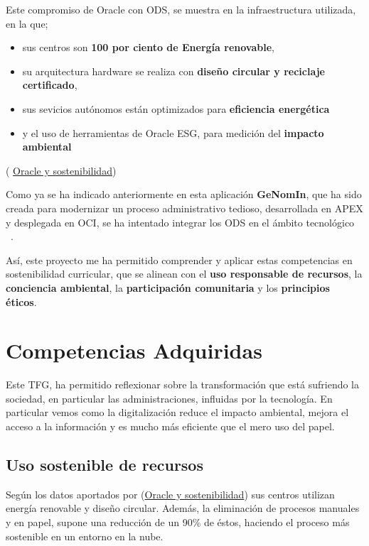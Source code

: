 Este compromiso de Oracle con \acrshort{ODS}, se muestra en la infraestructura utilizada, en la que; 
\begin{itemize}
	\item sus centros son \textbf{100 por ciento de Energía renovable}, 
	\item su arquitectura hardware se realiza con \textbf{diseño circular y reciclaje certificado}, 
	\item sus sevicios autónomos están optimizados para \textbf{eficiencia energética}
	\item y el uso de herramientas de Oracle  \acrfull{ESG}, para medición del \textbf{impacto ambiental}
\end{itemize}	( \href{https://www.oracle.com/es/sustainability/}{Oracle y sostenibilidad})

Como ya se ha indicado anteriormente en esta aplicación \textbf{GeNomIn}, que ha sido creada para modernizar un proceso administrativo tedioso, desarrollada en \acrshort{APEX} y desplegada en \acrshort{OCI}, se ha intentado integrar los \acrfull{ODS} en el ámbito tecnológico ~\cite{MarkiegiIntegrandoODSGrado}.

Así, este proyecto me ha permitido comprender y aplicar estas competencias en sostenibilidad curricular, que se alinean con el \textbf{uso responsable de recursos}, la\textbf{ conciencia ambiental}, la \textbf{participación comunitaria} y los \textbf{principios éticos}.

\section{Competencias Adquiridas}
Este \acrshort{TFG}, ha permitido reflexionar sobre la transformación que está sufriendo la sociedad, en particular las administraciones, influidas por la tecnología. En particular vemos como la digitalización reduce el impacto ambiental, mejora el acceso a la información y es mucho más eficiente que el mero uso del papel.

\subsection{Uso sostenible de recursos}

Según los datos aportados por (\href{https://www.oracle.com/es/sustainability/}{Oracle y sostenibilidad}) sus centros utilizan energía renovable y diseño circular. Además, la eliminación de procesos manuales y en papel, supone una reducción de un 90\% de éstos, haciendo el proceso más sostenible en un entorno en la nube.

